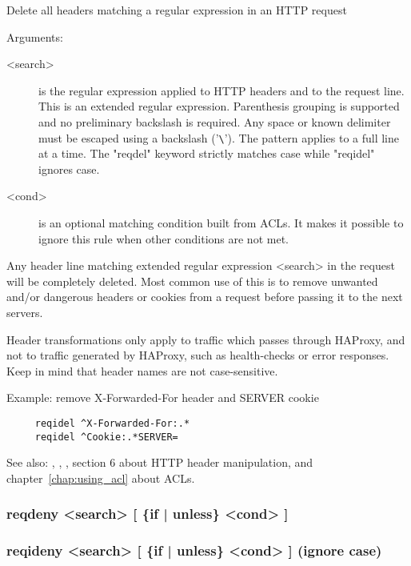 {

  Delete all headers matching a regular expression in an HTTP request


  Arguments:

\begin{description}
\item[<search>]  is the regular expression applied to HTTP headers and to the
              request line. This is an extended regular expression. Parenthesis
              grouping is supported and no preliminary backslash is required.
              Any space or known delimiter must be escaped using a backslash
              ('\verb|\|'). The pattern applies to a full line at a time. The "reqdel"
              keyword strictly matches case while "reqidel" ignores case.

\item[<cond>] is an optional matching condition built from ACLs. It makes it
              possible to ignore this rule when other conditions are not met.
\end{description}

  Any header line matching extended regular expression <search> in the request
  will be completely deleted. Most common use of this is to remove unwanted
  and/or dangerous headers or cookies from a request before passing it to the
  next servers.

  Header transformations only apply to traffic which passes through HAProxy,
  and not to traffic generated by HAProxy, such as health-checks or error
  responses. Keep in mind that header names are not case-sensitive.

  Example: remove X-Forwarded-For header and SERVER cookie
\begin{verbatim}
     reqidel ^X-Forwarded-For:.*
     reqidel ^Cookie:.*SERVER=
\end{verbatim}

  See also: , , , section 6 about HTTP header
            manipulation, and chapter~\ref{chap:using_acl} about ACLs.

\subsubsection[reqdeny]{reqdeny  <search> [ \{if | unless\} <cond> ]}
\subsubsection[reqideny]{reqideny <search> [ \{if | unless\} <cond> ]  (ignore case)}

}

